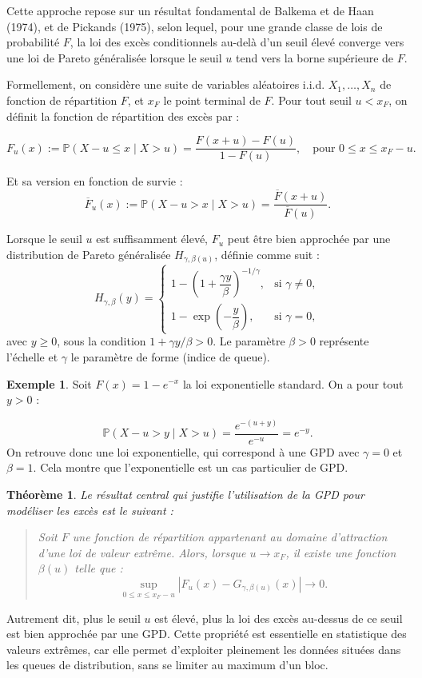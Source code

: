 \documentclass{article}
\theoremstyle{plain}
\theoremstyle{definition}
\newtheorem{example}[definition]{Exemple}
\theoremstyle{plain}
\newtheorem{theorem}[definition]{Théorème}
\begin{document}
\medskip
\noindent Cette approche repose sur un résultat fondamental de Balkema et de Haan (1974), et de Pickands (1975), selon lequel, pour une grande classe de lois de probabilité \(F\), la loi des excès conditionnels au-delà d’un seuil élevé converge vers une loi de Pareto généralisée lorsque le seuil \(u\) tend vers la borne supérieure de \(F\).

\medskip
\noindent Formellement, on considère une suite de variables aléatoires i.i.d. \(X_1, \dots, X_n\) de fonction de répartition \(F\), et \(x_F\) le point terminal de \(F\). Pour tout seuil \(u < x_F\), on définit la fonction de répartition des excès par :

\[
F_u(x) := \mathbb{P}(X - u \leq x \mid X > u) = \frac{F(x + u) - F(u)}{1 - F(u)},
\quad \text{pour } 0 \leq x \leq x_F - u.
\]

\noindent Et sa version en fonction de survie :
\[
\overline{F}_u(x) := \mathbb{P}(X - u > x \mid X > u) = \frac{\overline{F}(x + u)}{\overline{F}(u)}.
\]

\noindent Lorsque le seuil \(u\) est suffisamment élevé, \(F_u\) peut être bien approchée par une distribution de Pareto généralisée \(H_{\gamma, \beta(u)}\), définie comme suit :
\[
H_{\gamma, \beta}(y) =
\begin{cases}
1 - \left(1 + \dfrac{\gamma y}{\beta}\right)^{-1/\gamma}, & \text{si } \gamma \neq 0, \\
1 - \exp\left(-\dfrac{y}{\beta}\right), & \text{si } \gamma = 0,
\end{cases}
\]
avec \( y \geq 0 \), sous la condition \(1 + \gamma y/\beta > 0\). Le paramètre \(\beta > 0\) représente l’échelle et \(\gamma\) le paramètre de forme (indice de queue).

\medskip
\begin{example}
Soit \(F(x) = 1 - e^{-x}\) la loi exponentielle standard. On a pour tout \(y > 0\) :

\[
\mathbb{P}(X - u > y \mid X > u) = \frac{e^{-(u + y)}}{e^{-u}} = e^{-y}.
\]
On retrouve donc une loi exponentielle, qui correspond à une GPD avec \(\gamma = 0\) et \(\beta = 1\). Cela montre que l’exponentielle est un cas particulier de GPD.
\end{example}

\begin{theorem}

Le résultat central qui justifie l’utilisation de la GPD pour modéliser les excès est le suivant :

\begin{quote}
\noindent Soit \(F\) une fonction de répartition appartenant au domaine d’attraction d’une loi de valeur extrême. Alors, lorsque \(u \to x_F\), il existe une fonction \(\beta(u)\) telle que :
\[
\sup_{0 \leq x \leq x_F - u} \left| F_u(x) - G_{\gamma, \beta(u)}(x) \right| \to 0.
\]
\end{quote}
\end{theorem}
\noindent Autrement dit, plus le seuil \(u\) est élevé, plus la loi des excès au-dessus de ce seuil est bien approchée par une GPD.
\medskip
\noindent Cette propriété est essentielle en statistique des valeurs extrêmes, car elle permet d’exploiter pleinement les données situées dans les queues de distribution, sans se limiter au maximum d’un bloc.
\newpage
\end{document}
